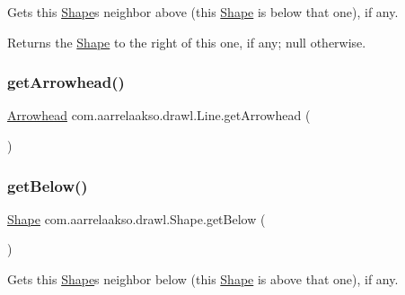 Gets this \hyperlink{classcom_1_1aarrelaakso_1_1drawl_1_1_shape}{Shape}\textquotesingle{}s neighbor above (this \hyperlink{classcom_1_1aarrelaakso_1_1drawl_1_1_shape}{Shape} is below that one), if any. 

\begin{DoxyReturn}{Returns}
the \hyperlink{classcom_1_1aarrelaakso_1_1drawl_1_1_shape}{Shape} to the right of this one, if any; {\ttfamily null} otherwise. 
\end{DoxyReturn}
\mbox{\label{classcom_1_1aarrelaakso_1_1drawl_1_1_line_a9659e69575b1fd2bd2f6dbfc7e11521b}} 
\subsubsection{\texorpdfstring{get\+Arrowhead()}{getArrowhead()}}
{\footnotesize\ttfamily \hyperlink{classcom_1_1aarrelaakso_1_1drawl_1_1_arrowhead}{Arrowhead} com.\+aarrelaakso.\+drawl.\+Line.\+get\+Arrowhead (\begin{DoxyParamCaption}{ }\end{DoxyParamCaption})\hspace{0.3cm}{\ttfamily [private]}}

\mbox{\label{classcom_1_1aarrelaakso_1_1drawl_1_1_shape_a53de5ab609d879719cd3b372dfe8df58}} 
\subsubsection{\texorpdfstring{get\+Below()}{getBelow()}}
{\footnotesize\ttfamily \hyperlink{classcom_1_1aarrelaakso_1_1drawl_1_1_shape}{Shape} com.\+aarrelaakso.\+drawl.\+Shape.\+get\+Below (\begin{DoxyParamCaption}{ }\end{DoxyParamCaption})\hspace{0.3cm}{\ttfamily [inherited]}}



Gets this \hyperlink{classcom_1_1aarrelaakso_1_1drawl_1_1_shape}{Shape}\textquotesingle{}s neighbor below (this \hyperlink{classcom_1_1aarrelaakso_1_1drawl_1_1_shape}{Shape} is above that one), if any. 

